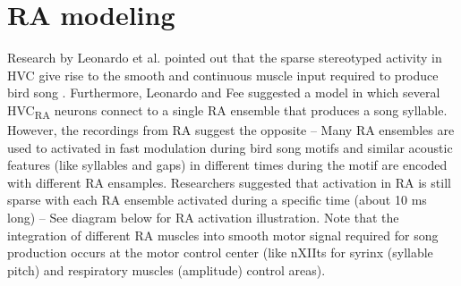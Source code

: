 \documentclass[draft,12pt,oneside]{CUNY_PhD}
\begin{document}
\section{RA modeling}
Research by Leonardo et al. pointed out that the sparse stereotyped activity in HVC give rise to the smooth and continuous muscle input required to produce bird song \cite{4}. Furthermore, Leonardo and Fee \cite{4} suggested a model in which several HVC\textsubscript{RA} neurons connect to a single RA ensemble that produces a song syllable. However, the recordings from RA suggest the opposite – Many RA ensembles are used to activated in fast modulation during bird song motifs and similar acoustic features (like syllables and gaps) in different times during the motif are encoded with different RA ensamples. Researchers \cite{4} suggested that activation in RA is still sparse with each RA ensemble activated during a specific time (about 10 ms long) – See diagram below for RA activation illustration. Note that the integration of different RA muscles into smooth motor signal required for song production occurs at the motor control center (like nXIIts for syrinx (syllable pitch) and respiratory muscles (amplitude) control areas).
\end{document}
